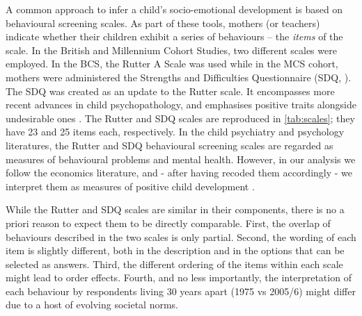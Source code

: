 A common approach to infer a child's socio-emotional development is based on behavioural screening scales. As part of these tools, mothers (or teachers) indicate whether their children exhibit a series of behaviours -- the \emph{items} of the scale. In the British and Millennium Cohort Studies, two different scales were employed. In the BCS, the Rutter A Scale was used \citep{Rutter1970} while in the MCS cohort, mothers were  administered the Strengths and Difficulties Questionnaire (SDQ, \citealp{Goodman1994,Goodman1997}). The SDQ was created as an update to the Rutter scale. It encompasses more recent advances in child psychopathology, and emphasises positive traits alongside undesirable ones \citep{Stone2010}. The Rutter and SDQ scales are reproduced in \autoref{tab:scales}; they have 23 and 25 items each, respectively. In the child psychiatry and psychology literatures, the Rutter and SDQ behavioural screening scales are regarded as measures of behavioural problems and mental health. However, in our analysis we follow the economics literature, and - after having recoded them accordingly - we interpret them as measures of positive child development \citep{goodman2011population}.

While the Rutter and SDQ scales are similar in their components, there is no a priori reason to expect them to be directly comparable. First, the overlap of behaviours described in the two scales is only partial. Second, the wording of each item is slightly different, both in the description and in the options that can be selected as answers. Third, the different ordering of the items within each scale might lead to order effects. Fourth, and no less importantly, the interpretation of each behaviour by respondents living 30 years apart (1975 vs 2005/6) might differ due to a host of evolving societal norms.

